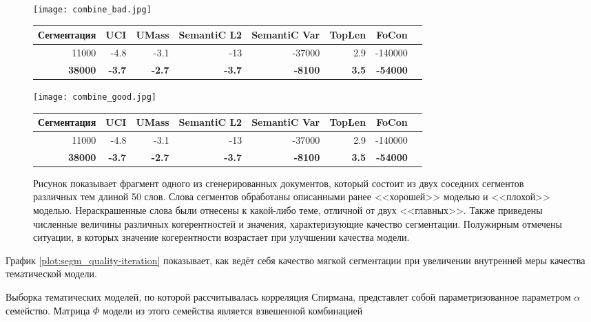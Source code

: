 \begin{figure}[h]

    \centering
    \texttt{[image: combine\_bad.jpg]}

    \scriptsize
    \centering
    \begin{tabular}{rrrrrrrr}
      Сегментация & UCI & UMass & SemantiC L2 & SemantiC Var & TopLen & FoCon\\
      \midrule
      \rowcolor{my-blue-light}
      11000 & -4.8 & -3.1 & -13 & -37000 & 2.9 & -140000\\
      \textbf{38000} & \textbf{-3.7} & \textbf{-2.7} & \textbf{-3.7} & \textbf{-8100} & \textbf{3.5} & \textbf{-54000}
    \end{tabular}

    \centering
    \texttt{[image: combine\_good.jpg]}

    \scriptsize
    \centering
    \begin{tabular}{rrrrrrrr}
      Сегментация & UCI & UMass & SemantiC L2 & SemantiC Var & TopLen & FoCon\\
      \midrule
      11000 & -4.8 & -3.1 & -13 & -37000 & 2.9 & -140000\\
      \rowcolor{my-blue-light}
      \textbf{38000} & \textbf{-3.7} & \textbf{-2.7} & \textbf{-3.7} & \textbf{-8100} & \textbf{3.5} & \textbf{-54000}
    \end{tabular}

    \caption{Рисунок показывает фрагмент одного из сгенерированных документов, который состоит из двух соседних сегментов различных тем длиной 50 слов. Слова сегментов обработаны описанными ранее <<хорошей>> моделью и <<плохой>> моделью. Нераскрашенные слова были отнесены к какой-либо теме, отличной от двух <<главных>>. Также приведены численные величины различных когерентностей и значения, характеризующие качество сегментации. Полужирным отмечены ситуации, в которых значение когерентности возрастает при улучшении качества модели.}
    \label{fig:segm_good_bad}
\end{figure}




График \ref{plot:segm_quality-iteration} показывает, как ведёт себя качество мягкой сегментации при увеличении внутренней меры качества тематической модели.

Выборка тематических моделей, по которой рассчитывалась корреляция Спирмана, представлет собой параметризованное параметром $\alpha$ семейство. Матрица $\Phi$ модели из этого семейства является взвешенной комбинацией

